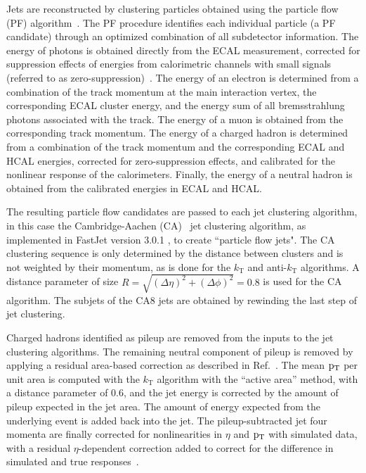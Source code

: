 Jets are reconstructed by clustering particles 
obtained using the particle flow (PF) algorithm~\cite{jetid,particleflow,particleflow2}. 
The PF procedure identifies each individual particle (a PF candidate) 
through an optimized combination of all subdetector information. 
The energy of photons is obtained directly from the ECAL measurement, 
corrected for suppression effects of energies from calorimetric channels 
with small signals (referred to as zero-suppression)~\cite{Chatrchyan:2013dgaParticle}. 
The energy of an electron is determined from a combination 
of the track momentum at the main interaction vertex, 
the corresponding ECAL cluster energy, and the energy 
sum of all bremsstrahlung photons associated with the track. 
The energy of a muon is obtained from the corresponding track momentum. 
The energy of a charged hadron is determined from a combination of the track momentum 
and the corresponding ECAL and HCAL energies, corrected for zero-suppression effects, 
and calibrated for the nonlinear response of the calorimeters. 
Finally, the energy of a neutral hadron is obtained from the calibrated energies in ECAL and HCAL.


The resulting
particle flow candidates are passed to each jet clustering algorithm, in this case the
Cambridge-Aachen (CA)~\cite{CAaachen,CAcambridge}
jet clustering algorithm, as implemented in FastJet version 3.0.1 \cite{fastjet1,fastjet},
to create ``particle flow jets".
The CA clustering sequence is only determined by the distance between
clusters and is not weighted by their momentum, as is done for the
$k_\text{T}$ and anti-$k_\text{T}$ algorithms. A distance parameter of
size $R=\sqrt{(\Delta \eta)^2 + (\Delta\phi)^2}=0.8$ is used for the CA algorithm.
The subjets of the CA8 jets are obtained by rewinding the last step of jet clustering. 


Charged hadrons identified as pileup are removed from the inputs to
the jet clustering algorithms.  The remaining neutral component of pileup
is removed by applying a residual area-based correction as
described in Ref.~\cite{jetarea_fastjet,jetarea_fastjet_pu}.  The mean
$\mathrm{p_{T}}$ per unit area is computed with the $k_{\mathrm T}$ algorithm
with the ``active area'' method, with a distance parameter of 0.6, and
the jet energy is corrected by the amount of pileup expected in the
jet area. The amount of energy expected from the underlying event is
added back into the jet.  The pileup-subtracted jet four momenta are
finally corrected for nonlinearities in $\eta$ and $\mathrm{p_{T}}$ with
simulated data, with a residual $\eta$-dependent correction added to
correct for the difference in simulated and true
responses~\cite{JME-JINST,Collaboration:2012dp}.

